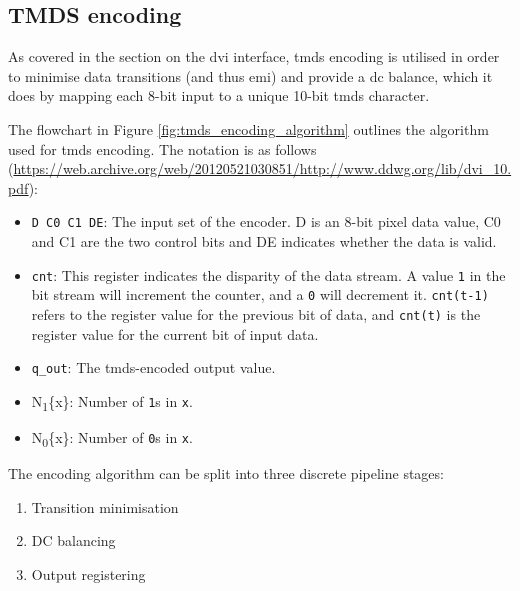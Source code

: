 \subsection{TMDS encoding}
As covered in the section on the \gls{dvi} interface, \gls{tmds} encoding is utilised in order to minimise data transitions (and thus \gls{emi}) and provide a \gls{dc} balance, which it does by mapping each 8-bit input to a unique 10-bit \gls{tmds} character.

The flowchart in Figure \ref{fig:tmds_encoding_algorithm} outlines the algorithm used for \gls{tmds} encoding. The notation is as follows (\url{https://web.archive.org/web/20120521030851/http://www.ddwg.org/lib/dvi_10.pdf}):
\begin{itemize}
    \item \texttt{D C0 C1 DE}: The input set of the encoder. D is an 8-bit pixel data value, C0 and C1 are the two control bits and DE indicates whether the data is valid.
    \item \texttt{cnt}: This register indicates the disparity of the data stream. A value \texttt{1} in the bit stream will increment the counter, and a \texttt{0} will decrement it. \texttt{cnt(t-1)} refers to the register value for the previous bit of data, and \texttt{cnt(t)} is the register value for the current bit of input data.
    \item \texttt{q\_out}: The \gls{tmds}-encoded output value.
    \item N\textsubscript{1}\{x\}: Number of \texttt{1}s in \texttt{x}.
    \item N\textsubscript{0}\{x\}: Number of \texttt{0}s in \texttt{x}.
\end{itemize}

The encoding algorithm can be split into three discrete pipeline stages:
\begin{enumerate}
    \item Transition minimisation
    \item DC balancing
    \item Output registering
\end{enumerate}


